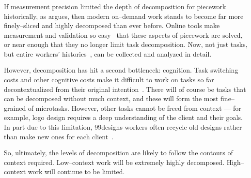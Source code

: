 \documentclass[trackingWork]{subfiles}
\begin{document}
\onlyinsubfile{\clearpage}
\subsubsection{\implication}
If measurement precision limited the depth of decomposition for piecework historically,
as \citeauthor{10.2307/23702539} argues,
then modern on--demand work stands to become far more finely--sliced and highly decomposed than ever before.
Online tools make measurement and validation so easy~\cite{rzeszotarski2011instrumenting} that these aspects of piecework are solved,
or near enough that they no longer limit task decomposition.
Now,
not just tasks,
but entire workers' histories~\cite{hata2017glimpse},
can be collected and analyzed in detail.

However,
decomposition has hit a second bottleneck: cognition. 
Task switching costs and other cognitive costs make it difficult
to work on tasks so far decontextualized from their original intention~\cite{delayAndOrderLasecki}.
There will of course be tasks that can be decomposed without much context,
and these will form the most fine--grained of microtasks.
However, other tasks cannot be freed from context
--- for example,
logo design requires a deep understanding of the client and their goals.
In part due to this limitation,
99designs workers often recycle old designs rather than make new ones for each client~\cite{araujo201399designs}.

So,
ultimately,
the levels of decomposition are likely to follow the contours of context required.
Low--context work will be extremely highly decomposed.
High--context work will continue to be limited.


\end{document}
